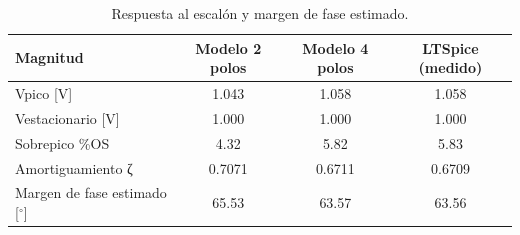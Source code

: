 \begin{table}[H]
\centering
\begin{tabular}{lccc}
\toprule
Magnitud & Modelo 2 polos & Modelo 4 polos & LTSpice (medido) \\
\midrule
Vpico [V] & 1.043 & 1.058 & 1.058 \\
Vestacionario [V] & 1.000 & 1.000 & 1.000 \\
Sobrepico \%OS & 4.32 & 5.82 & 5.83 \\
Amortiguamiento ζ & 0.7071 & 0.6711 & 0.6709 \\
Margen de fase estimado [$^\circ$] & 65.53 & 63.57 & 63.56 \\
\bottomrule
\end{tabular}
\caption{Respuesta al escalón y margen de fase estimado.}
\label{tab:escalon_c1}
\end{table}